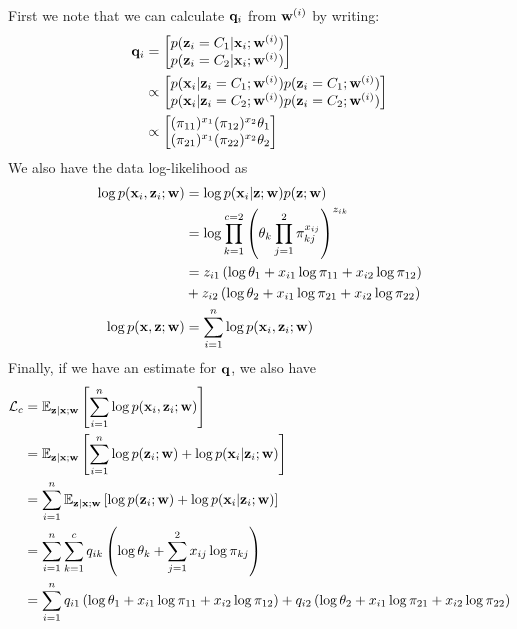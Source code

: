 \documentclass[12pt,letterpaper]{article}
\begin{document}
\noindent First we note that we can calculate $\mathbf{q}_i$ from $\mathbf{w}^{(i)}$ by writing:
	\begin{align}
		\mathbf{q}_i &= \begin{bmatrix}p(\mathbf{z}_i = C_1 | \mathbf{x}_i; \mathbf{w}^{(i)}) \\ p(\mathbf{z}_i = C_2 | \mathbf{x}_i; \mathbf{w}^{(i)})\end{bmatrix} \\
		    &\propto \begin{bmatrix}p(\mathbf{x}_i | \mathbf{z}_i = C_1; \mathbf{w}^{(i)})p(\mathbf{z}_i = C_1; \mathbf{w}^{(i)}) \\ p(\mathbf{x}_i | \mathbf{z}_i = C_2; \mathbf{w}^{(i)})p(\mathbf{z}_i = C_2; \mathbf{w}^{(i)})\end{bmatrix} \\
			&\propto \begin{bmatrix}(\pi_{11})^{x_1}(\pi_{12})^{x_2}\theta_1\\ (\pi_{21})^{x_1}(\pi_{22})^{x_2}\theta_2\end{bmatrix}
	\end{align}
\noindent We also have the data log-likelihood as
	\begin{align}
	\log p(\mathbf{x}_i, \mathbf{z}_i; \mathbf{w}) &= \log p(\mathbf{x}_i | \mathbf{z}; \mathbf{w})p(\mathbf{z}; \mathbf{w})\\
	    &= \log \prod_{k = 1}^{c = 2}\left(\theta_k\prod_{j = 1}^{2}\pi_{kj}^{x_{ij}}\right)^{z_{ik}}\\
	    &= z_{i1}\left(\log\theta_1 + x_{i1}\log \pi_{11} + x_{i2}\log \pi_{12}\right) \\
	    &+ z_{i2}\left(\log\theta_2 + x_{i1}\log \pi_{21} + x_{i2}\log \pi_{22}\right) \\
    \log p(\mathbf{x}, \mathbf{z}; \mathbf{w}) &= \sum_{i = 1}^n \log p(\mathbf{x}_i, \mathbf{z}_i; \mathbf{w})
	\end{align}
Finally, if we have an estimate for $\mathbf{q}$, we also have
	\begin{align}
		\mathcal{L}_{c} &= \mathbb{E}_{\mathbf{z} | \mathbf{x} ; \mathbf{w}}\left[\sum_{i = 1}^n \log p(\mathbf{x}_i, \mathbf{z}_i; \mathbf{w})\right]\\
		&= \mathbb{E}_{\mathbf{z} | \mathbf{x} ; \mathbf{w}} \left[\sum_{i=1}^n\log p(\mathbf{z}_i ; \mathbf{w}) + \log p(\mathbf{x}_i | \mathbf{z}_i ; \mathbf{w}) \right] \\
		&= \sum_{i = 1}^n \mathbb{E}_{\mathbf{z} | \mathbf{x} ; \mathbf{w}} \left[ \log p(\mathbf{z}_i ; \mathbf{w}) + \log p(\mathbf{x}_i | \mathbf{z}_i ; \mathbf{w})\right]\\
		&= \sum_{i = 1}^n \sum_{k = 1}^c q_{ik}\left(\log \theta_k + \sum_{j = 1}^2 x_{ij} \log \pi_{kj}\right) \\
		&= \sum_{i = 1}^n q_{i1}\left(\log\theta_1 + x_{i1}\log \pi_{11} + x_{i2}\log \pi_{12}\right) + q_{i2}\left(\log\theta_2 + x_{i1}\log \pi_{21} + x_{i2}\log \pi_{22}\right)
	\end{align}
\end{document}
